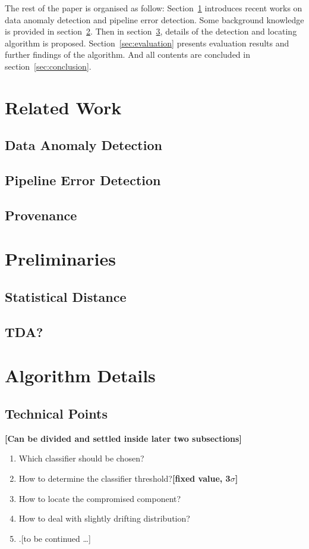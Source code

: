 \documentclass[a4paper]{IEEEtran}
\begin{document}
		The rest of the paper is organised as follow: Section~\ref{sec:related-work} introduces recent works on data anomaly detection and pipeline error detection. Some background knowledge is provided in section~\ref{sec:preliminaries}. Then in section~\ref{sec:algorithm-details}, details of the detection and locating algorithm is proposed. Section~\ref{sec:evaluation} presents evaluation results and further findings of the algorithm. And all contents are concluded in section~\ref{sec:conclusion}.
	
	\section{Related Work}\label{sec:related-work}
		\subsection{Data Anomaly Detection}
		
		\subsection{Pipeline Error Detection}
		
		\subsection{Provenance}
	
	\section{Preliminaries}\label{sec:preliminaries}
		\subsection{Statistical Distance}
		
		\subsection{TDA?}
	
	\section{Algorithm Details}\label{sec:algorithm-details}
		\subsection{Technical Points}
			\textbf{[Can be divided and settled inside later two subsections]}
			\begin{enumerate}
				\item Which classifier should be chosen?
				\item How to determine the classifier threshold?\textbf{[fixed value, 3$\sigma$]}
				\item How to locate the compromised component?
				\item How to deal with slightly drifting distribution?
				\item .[to be continued \dots]
			\end{enumerate}
			
\end{document}
